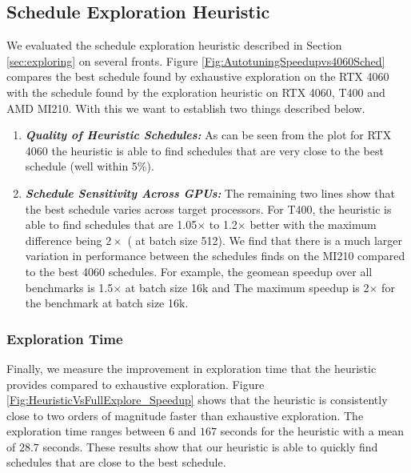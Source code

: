 \subsection{Schedule Exploration Heuristic}
We evaluated the schedule exploration heuristic described in Section \ref{sec:exploring} on several fronts.
Figure \ref{Fig:AutotuningSpeedupvs4060Sched} compares the best schedule found by exhaustive exploration on the RTX 4060 
with the schedule found by the exploration heuristic on RTX 4060, T400 and AMD MI210.
With this we want to establish two things described below.
\begin{enumerate}
\item \textbf{\emph{Quality of Heuristic Schedules:}}
As can be seen from the plot  
for RTX 4060 the heuristic is able to find schedules that are very close to the best schedule (well 
within 5\%).
\item \textbf{\emph{Schedule Sensitivity Across GPUs:}}
The remaining two lines show that the best schedule varies across target processors.
For T400, the heuristic is able to find schedules that are 1.05$\times$ to 1.2$\times$ better 
with the maximum difference being $2\times$ ( at batch size 512).
We find that there is a much larger variation in performance 
between the schedules \Treebeard{} finds on the MI210 compared to the best 4060 schedules. For example, 
the geomean speedup over all benchmarks is 1.5$\times$ at batch size 16k and 
The maximum speedup is 2$\times$ for the  benchmark at batch size 16k. 
\end{enumerate}

\subsubsection*{Exploration Time}
Finally, we measure the improvement in exploration time that the heuristic provides 
compared to exhaustive exploration. Figure \ref{Fig:HeuristicVsFullExplore_Speedup} shows that the heuristic
is consistently close to two orders of magnitude faster than exhaustive exploration. 
The exploration time ranges between $6$ and $167$ seconds for the heuristic with a mean of $28.7$ seconds.
These results show that our heuristic is able to quickly find schedules that are close to the best schedule.

